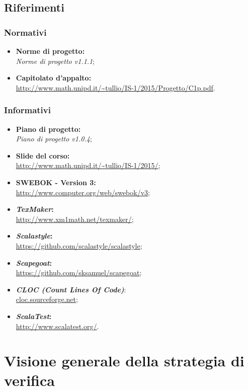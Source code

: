 \documentclass[a4paper]{article}
\begin{document}
		\subsection{Riferimenti}
			\subsubsection{Normativi}
				\begin{itemize}
					\item \textbf{Norme di progetto:} \\ \emph{Norme di progetto v1.1.1};
					\item \textbf{Capitolato d'appalto:} \\ \url{http://www.math.unipd.it/~tullio/IS-1/2015/Progetto/C1p.pdf}.
				\end{itemize}
			\subsubsection{Informativi}
				\begin{itemize}
					\item \textbf{Piano di progetto:} \\ \emph{Piano di progetto v1.0.4};
					\item \textbf{Slide del corso:} \\ \url{http://www.math.unipd.it/~tullio/IS-1/2015/};
					\item \textbf{SWEBOK - Version 3:} \\ \url{http://www.computer.org/web/swebok/v3};
					\item \textbf{\emph{TexMaker}:}\\ \url{http://www.xm1math.net/texmaker/};
				    \item \textbf{\emph{Scalastyle}:}\\ \url{https://github.com/scalastyle/scalastyle};
					\item \textbf{\emph{Scapegoat}:}\\ \url{https://github.com/sksamuel/scapegoat};
					\item \textbf{\emph{CLOC (Count Lines Of Code)}}:\\ \url{cloc.sourceforge.net};
					\item \textbf{\emph{ScalaTest}:}\\ \url{http://www.scalatest.org/}.
				\end{itemize}
	\section{Visione generale della strategia di verifica}
		
\end{document}
